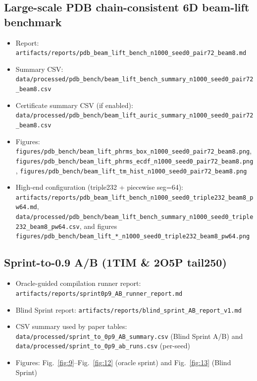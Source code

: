 \subsection*{Large-scale PDB chain-consistent 6D beam-lift benchmark}
\begin{itemize}
  \item Report: \texttt{artifacts/reports/pdb\_beam\_lift\_bench\_n1000\_seed0\_pair72\_beam8.md}
  \item Summary CSV: \texttt{data/processed/pdb\_bench/beam\_lift\_bench\_summary\_n1000\_seed0\_pair72\_beam8.csv}
  \item Certificate summary CSV (if enabled): \texttt{data/processed/pdb\_bench/beam\_lift\_auric\_summary\_n1000\_seed0\_pair72\_beam8.csv}
  \item Figures: \texttt{figures/pdb\_bench/beam\_lift\_phrms\_box\_n1000\_seed0\_pair72\_beam8.png}, \texttt{figures/pdb\_bench/beam\_lift\_phrms\_ecdf\_n1000\_seed0\_pair72\_beam8.png}, \texttt{figures/pdb\_bench/beam\_lift\_tm\_hist\_n1000\_seed0\_pair72\_beam8.png}
  \item High-end configuration (triple232 + piecewise seg=64): \texttt{artifacts/reports/pdb\_beam\_lift\_bench\_n1000\_seed0\_triple232\_beam8\_pw64.md}, \texttt{data/processed/pdb\_bench/beam\_lift\_bench\_summary\_n1000\_seed0\_triple232\_beam8\_pw64.csv}, and figures \texttt{figures/pdb\_bench/beam\_lift\_*\_n1000\_seed0\_triple232\_beam8\_pw64.png}
\end{itemize}

\subsection*{Sprint-to-0.9 A/B (1TIM \& 2O5P tail250)}
\begin{itemize}
  \item Oracle-guided compilation runner report: \texttt{artifacts/reports/sprint0p9\_AB\_runner\_report.md}
  \item Blind Sprint report: \texttt{artifacts/reports/blind\_sprint\_AB\_report\_v1.md}
  \item CSV summary used by paper tables: \texttt{data/processed/sprint\_to\_0p9\_AB\_summary.csv} (Blind Sprint A/B) and \texttt{data/processed/sprint\_to\_0p9\_ab\_runs.csv} (per-seed)
  \item Figures: Fig.~\ref{fig:9}--Fig.~\ref{fig:12} (oracle sprint) and Fig.~\ref{fig:13} (Blind Sprint)
\end{itemize}
